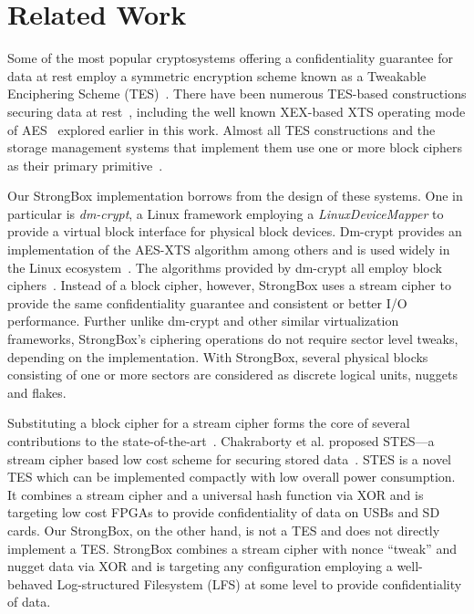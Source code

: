 \section{Related Work} \label{sec:related}

Some of the most popular cryptosystems offering a confidentiality
guarantee for data at rest employ a symmetric encryption scheme known
as a Tweakable Enciphering Scheme (TES)~\cite{STES,XEX}. There have
been numerous TES-based constructions securing data at
rest~\cite{STES,CMC,HCTR}, including the well known XEX-based XTS
operating mode of AES~\cite{XTS} explored earlier in this work. Almost
all TES constructions and the storage management systems that
implement them use one or more block ciphers as their primary
primitive~\cite{TES-From-Stream-Cipher,STES}.

Our StrongBox implementation borrows from the design of these systems. One in
particular is \emph{dm-crypt}, a Linux framework employing a
\textit{LinuxDeviceMapper} to provide a virtual block interface for physical
block devices. Dm-crypt provides an implementation of the AES-XTS algorithm among
others and is used widely in the Linux ecosystem~\cite{DmC-Android, dmcrypt}.
The algorithms provided by dm-crypt all employ block ciphers~\cite{dmcrypt}.
Instead of a block cipher, however, StrongBox uses a stream cipher to provide
the same confidentiality guarantee and consistent or better I/O performance.
Further unlike dm-crypt and other similar virtualization frameworks, StrongBox's
ciphering operations do not require sector level tweaks, depending on the
implementation. With StrongBox, several physical blocks consisting of one or
more sectors are considered as discrete logical units, \ie nuggets and flakes.

Substituting a block cipher for a stream cipher forms the core of several
contributions to the state-of-the-art~\cite{STES, TES-From-Stream-Cipher}.
Chakraborty et al. proposed STES---a stream cipher based low cost scheme for
securing stored data~\cite{STES}. STES is a novel TES which can be implemented
compactly with low overall power consumption. It combines a stream cipher and a
universal hash function via XOR and is targeting low cost FPGAs to provide
confidentiality of data on USBs and SD cards. Our StrongBox, on the other hand,
is not a TES and does not directly implement a TES. StrongBox combines a stream
cipher with nonce ``tweak'' and nugget data via XOR and is targeting any
configuration employing a well-behaved Log-structured Filesystem (LFS) at some
level to provide confidentiality of data.

